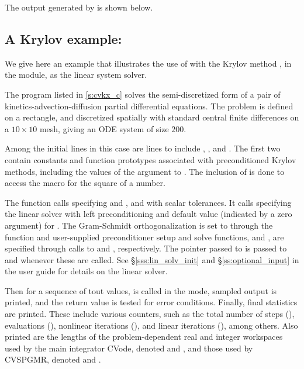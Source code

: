 The output generated by  is shown below.



\subsection{A Krylov example: }\label{ss:cvkx}

We give here an example that illustrates the use of {\cvode} with the
Krylov method {\spgmr}, in the {\cvspgmr} module, as the linear system
solver.

The program listed in \A\ref{s:cvkx_c} solves the semi-discretized form of a pair of
kinetics-advection-diffusion partial differential equations.  The
problem is defined on a rectangle, and discretized spatially with
standard central finite differences on a $10 \times 10$ mesh, giving
an ODE system of size $200$.

Among the initial  lines in this case are lines to
include , , and .
The first two contain constants and function prototypes associated
with preconditioned Krylov methods, including the values of the
 argument to .  The inclusion
of  is done to access the  macro for the
square of a  number.

The  function calls  specifying  and
, and  with scalar tolerances.  
It calls  specifying the {\cvspgmr} linear solver with left 
preconditioning and default value (indicated by a zero argument) for 
. The Gram-Schmidt orthogonalization is set to 
through the function  and
user-supplied preconditioner setup and solve functions,  and
, are specified through calls to 
and , respectively.
The  pointer passed to  is passed to
 and  whenever these are called. 
See \S\ref{sss:lin_solv_init} and \S\ref{ss:optional_input} in the
user guide for details on the {\cvspgmr} linear solver.

Then for a sequence of tout values,  is called in the
 mode, sampled output is printed, and the return value is
tested for error conditions.  Finally, final statistics are printed.  
These include various counters,
such as the total number of steps (),  evaluations
(), nonlinear iterations (), and linear iterations
(), among others.  Also printed are the lengths of the
problem-dependent real and integer workspaces used by the main
integrator CVode, denoted  and , and those
used by CVSPGMR, denoted  and .

